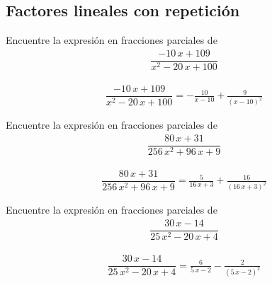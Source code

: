 \subsection{Factores lineales con repetición}

{}
	\begin{problema}
		Encuentre la expresión en fracciones parciales de
		\begin{align*}
			\dfrac{-10 \, x + 109}{x^{2} - 20 \, x + 100}
		\end{align*}
	\end{problema}
	
	\begin{align*}
		\dfrac{-10 \, x + 109}{x^{2} - 20 \, x + 100}= -\frac{10}{x - 10} + \frac{9}{{\left(x - 10\right)}^{2}}
	\end{align*}
	

{}
	\begin{problema}
		Encuentre la expresión en fracciones parciales de
		\begin{align*}
			\dfrac{80 \, x + 31}{256 \, x^{2} + 96 \, x + 9}
		\end{align*}
	\end{problema}
	
	\begin{align*}
		\dfrac{80 \, x + 31}{256 \, x^{2} + 96 \, x + 9}= \frac{5}{16 \, x + 3} + \frac{16}{{\left(16 \, x + 3\right)}^{2}}
	\end{align*}
	

{}
	\begin{problema}
		Encuentre la expresión en fracciones parciales de
		\begin{align*}
			\dfrac{30 \, x - 14}{25 \, x^{2} - 20 \, x + 4}
		\end{align*}
	\end{problema}
	
	\begin{align*}
		\dfrac{30 \, x - 14}{25 \, x^{2} - 20 \, x + 4}= \frac{6}{5 \, x - 2} - \frac{2}{{\left(5 \, x - 2\right)}^{2}}
	\end{align*}
	

